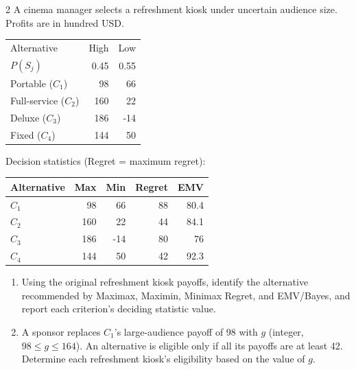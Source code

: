 \begin{multicols}{2}
\raggedcolumns
{}
A cinema manager selects a refreshment kiosk under uncertain audience size. Profits are in hundred USD.

\begin{center}\small\setlength{\tabcolsep}{4pt}
	\begin{tabular}{lrr}\toprule
		Alternative & High & Low\\
		$P(S_j)$ & 0.45 & 0.55\\ \midrule
				Portable ($C_1$) & 98 & 66\\
		Full-service ($C_2$) & 160 & 22\\
		Deluxe ($C_3$) & 186 & -14\\
		Fixed ($C_4$) & 144 & 50\\
		\bottomrule
	\end{tabular}
\end{center} \vspace{-3mm}

Decision statistics (Regret = maximum regret):

\begin{center}\small\setlength{\tabcolsep}{4pt}
	\begin{tabular}{lrrrr}\toprule
		Alternative & Max & Min & Regret & EMV\\ \midrule
				$C_1$ & 98 & 66 & 88 & 80.4\\
		$C_2$ & 160 & 22 & 44 & 84.1\\
		$C_3$ & 186 & -14 & 80 & 76\\
		$C_4$ & 144 & 50 & 42 & 92.3\\
		\bottomrule
	\end{tabular}
\end{center}

\begin{enumerate}[label=\textbf{(\alph*)},leftmargin=*]
	\item Using the original refreshment kiosk payoffs, identify the alternative recommended by Maximax, Maximin, Minimax Regret, and EMV/Bayes, and report each criterion's deciding statistic value. 

	\item A sponsor replaces $C_1$'s large-audience payoff of 98 with $g$ (integer, $98\leq g\leq164$). An alternative is eligible only if all its payoffs are at least 42. Determine each refreshment kiosk's eligibility based on the value of $g$. 


\end{enumerate}
\end{multicols}
